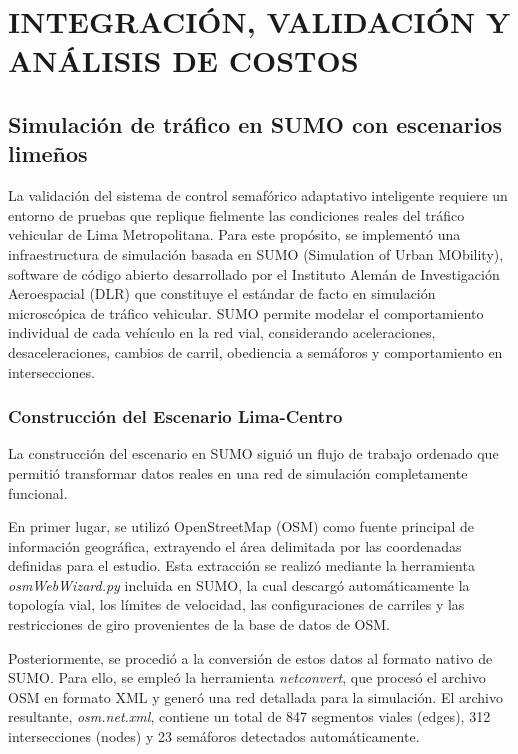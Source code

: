 \documentclass[12pt,a4paper,oneside]{report}
\begin{document}
\chapter{INTEGRACIÓN, VALIDACIÓN Y ANÁLISIS DE COSTOS}\label{capuxedtulo-7-integraciuxf3n-validaciuxf3n-y-anuxe1lisis-de-costos}

\section{Simulación de tráfico en SUMO con escenarios limeños}\label{simulaciuxf3n-de-truxe1fico-en-sumo-con-escenarios-limeuxf1os}

La validación del sistema de control semafórico adaptativo inteligente requiere un entorno de pruebas que replique fielmente las condiciones reales del tráfico vehicular de Lima Metropolitana. Para este propósito, se implementó una infraestructura de simulación basada en SUMO (Simulation of Urban MObility), software de código abierto desarrollado por el Instituto Alemán de Investigación Aeroespacial (DLR) que constituye el estándar de facto en simulación microscópica de tráfico vehicular. SUMO permite modelar el comportamiento individual de cada vehículo en la red vial, considerando aceleraciones, desaceleraciones, cambios de carril, obediencia a semáforos y comportamiento en intersecciones.

\subsection{Construcción del Escenario Lima-Centro}\label{construcciuxf3n-del-escenario-lima-centro}

La construcción del escenario en SUMO siguió un flujo de trabajo ordenado que permitió transformar datos reales en una red de simulación completamente funcional.

En primer lugar, se utilizó OpenStreetMap (OSM) como fuente principal de información geográfica, extrayendo el área delimitada por las coordenadas definidas para el estudio. Esta extracción se realizó mediante la herramienta \emph{osmWebWizard.py} incluida en SUMO, la cual descargó automáticamente la topología vial, los límites de velocidad, las configuraciones de carriles y las restricciones de giro provenientes de la base de datos de OSM.

Posteriormente, se procedió a la conversión de estos datos al formato nativo de SUMO. Para ello, se empleó la herramienta \emph{netconvert}, que procesó el archivo OSM en formato XML y generó una red detallada para la simulación. El archivo resultante, \emph{osm.net.xml}, contiene un total de 847 segmentos viales (edges), 312 intersecciones (nodes) y 23 semáforos detectados automáticamente.
\end{document}
